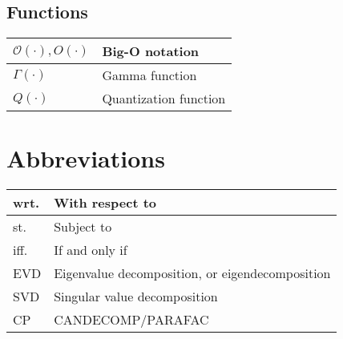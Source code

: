 \documentclass{article}
\begin{document}
\subsection{Functions}
\begin{xltabular}{\textwidth}{XX}
    \(\mathcal{O}(\cdot), O(\cdot)\) & Big-O notation\\ \hline
    \(\Gamma(\cdot)\) & Gamma function\\ \hline
    \(Q(\cdot)\) & Quantization function
\end{xltabular}

\section{Abbreviations}
\begin{xltabular}{\textwidth}{XX}
    wrt. & With respect to\\ \hline
    st. & Subject to\\ \hline
    iff. & If and only if\\ \hline
    EVD & Eigenvalue decomposition, or eigendecomposition \cite{nossekAdaptiveArraySignal2015}\\ \hline
    SVD & Singular value decomposition\\ \hline
    CP & CANDECOMP/PARAFAC\\
\end{xltabular}

\printbibliography
\end{document}
